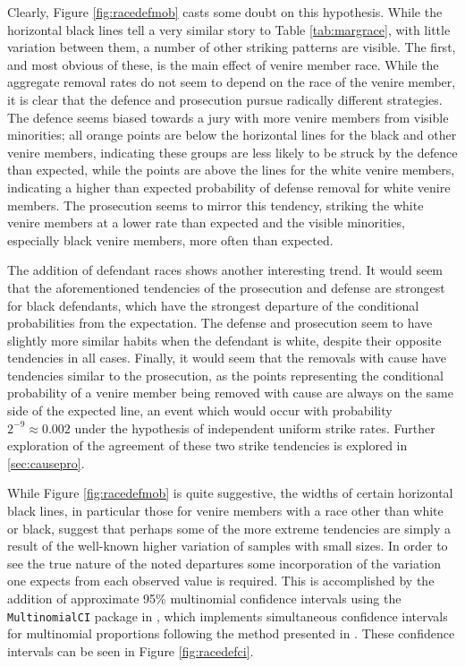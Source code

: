 Clearly, Figure \ref{fig:racedefmob} casts some doubt on this hypothesis. While the horizontal black lines tell a very similar
story to Table \ref{tab:margrace}, with little variation between them, a number of other striking patterns are visible. The first,
and most obvious of these, is the main effect of venire member race. While the aggregate removal rates do not seem to depend on
the race of the venire member, it is clear that the defence and prosecution pursue radically different strategies. The defence
seems biased towards a jury with more venire members from visible minorities; all orange points are below the horizontal lines for
the black and other venire members, indicating these groups are less likely to be struck by the defence than expected, while the
points are above the lines for the white venire members, indicating a higher than expected probability of defense removal for
white venire members. The prosecution seems to mirror this tendency, striking the white venire members at a lower rate than
expected and the visible minorities, especially black venire members, more often than expected.

The addition of defendant races shows another interesting trend. It would seem that the aforementioned tendencies of the
prosecution and defense are strongest for black defendants, which have the strongest departure of the conditional probabilities
from the expectation. The defense and prosecution seem to have slightly more similar habits when the defendant is white, despite
their opposite tendencies in all cases. Finally, it would seem that the removals with cause have tendencies similar to the
prosecution, as the points representing the conditional probability of a venire member being removed with cause are always on the
same side of the expected line, an event which would occur with probability $2^{-9} \approx 0.002$ under the hypothesis of
independent uniform strike rates. Further exploration of the agreement of these two strike tendencies is explored in
\ref{sec:causepro}.

While Figure \ref{fig:racedefmob} is quite suggestive, the widths of certain horizontal black lines, in particular those for
venire members with a race other than white or black, suggest that perhaps some of the more extreme tendencies are simply a result
of the well-known higher variation of samples with small sizes. In order to see the true nature of the noted departures some
incorporation of the variation one expects from each observed value is required. This is accomplished by the addition of
approximate 95\%  multinomial confidence intervals using the \texttt{MultinomialCI} package in \Rp, which implements simultaneous
confidence intervals for multinomial proportions following the method presented in \cite{sison1995}. These confidence intervals
can be seen in Figure \ref{fig:racedefci}.

